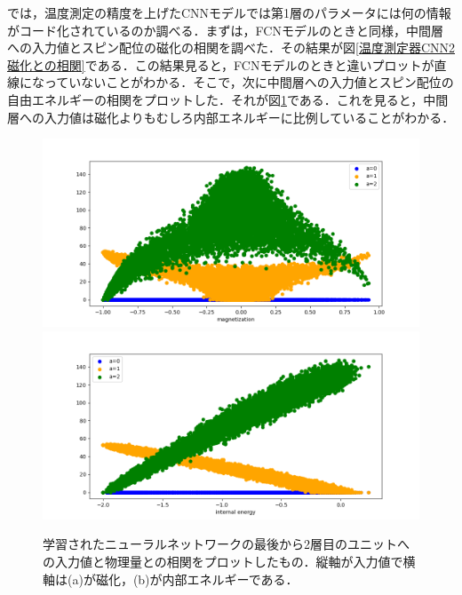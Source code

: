 \documentclass[a4paper,11pt]{jsreport}
\begin{document}
では，温度測定の精度を上げたCNNモデルでは第1層のパラメータには何の情報がコード化されているのか調べる．まずは，FCNモデルのときと同様，中間層への入力値とスピン配位の磁化の相関を調べた．その結果が図\ref{温度測定器CNN2磁化との相関}である．この結果見ると，FCNモデルのときと違いプロットが直線になっていないことがわかる．そこで，次に中間層への入力値とスピン配位の自由エネルギーの相関をプロットした．それが図\ref{温度測定器CNN2内部エネルギーとの相関}である．これを見ると，中間層への入力値は磁化よりもむしろ内部エネルギーに比例していることがわかる．\par

\begin{figure}[H]
  \begin{center}
    \includegraphics[width=\linewidth]{image/温度測定器2_L16_CNN_Nh3_mag.png}
    \label{温度測定器CNN2磁化との相関}
    \includegraphics[width=\linewidth]{image/温度測定器2_L16_CNN_Nh3_internal.png}
    \label{温度測定器CNN2内部エネルギーとの相関}
  \end{center}
  \caption{学習されたニューラルネットワークの最後から2層目のユニットへの入力値と物理量との相関をプロットしたもの．縦軸が入力値で横軸は(a)が磁化，(b)が内部エネルギーである．}
\end{figure}
\end{document}
